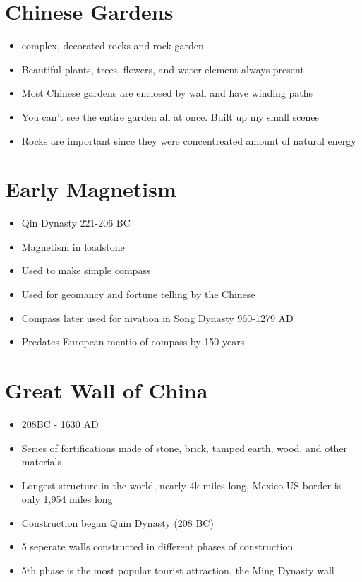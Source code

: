 \documentclass{article}
\begin{document}
\section*{Chinese Gardens}
\begin{itemize}
  \item complex, decorated rocks and rock garden
  \item Beautiful plants, trees, flowers, and water element always present
  \item Most Chinese gardens are enclosed by wall and have winding paths
  \item You can't see the entire garden all at once. Built up my small scenes
  \item Rocks are important since they were concentreated amount of natural energy
\end{itemize}

\section*{Early Magnetism}
\begin{itemize}
  \item Qin Dynasty 221-206 BC
  \item Magnetism in loadstone
  \item Used to make simple compass
  \item Used for geomancy and fortune telling by the Chinese
  \item Compass later used for nivation in Song Dynasty 960-1279 AD
  \item Predates European mentio of compass by 150 years
\end{itemize}

\section*{Great Wall of China}
\begin{itemize}
  \item 208BC - 1630 AD
  \item Series of fortifications made of stone, brick, tamped earth, wood, and other materials
  \item Longest structure in the world, nearly 4k miles long, Mexico-US border is only 1,954 miles long
  \item Construction began Quin Dynasty (208 BC)
  \item 5 seperate walls constructed in different phases of construction
  \item 5th phase is the most popular tourist attraction, the Ming Dynasty wall
\end{itemize}
\end{document}
